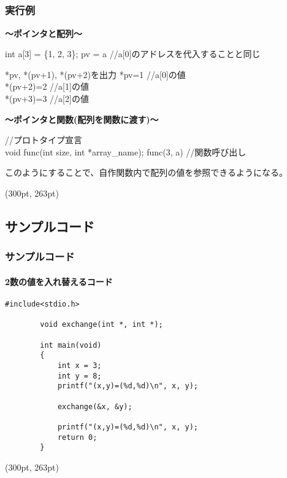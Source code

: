 \documentclass[dvipdfmx]{beamer}
\begin{document}
\subsection{}
\begin{frame}[t, fragile]
    \frametitle{実行例}
    \textbf{～ポインタと配列～}
    \begin{block}{int a[3] = \{1, 2, 3\};}
        pv = a //a[0]のアドレスを代入することと同じ
    \end{block}
    \begin{block}{*pv, *(pv+1), *(pv+2)を出力}
        *pv=1       //a[0]の値\\
        *(pv+2)=2   //a[1]の値\\
        *(pv+3)=3   //a[2]の値
    \end{block}
    \textbf{～ポインタと関数(配列を関数に渡す)～}
    \begin{block}{//プロトタイプ宣言\\
        void func(int size, int *array\_name);}
        func(3, a) //関数呼び出し
    \end{block}
    このようにすることで、自作関数内で配列の値を参照できるようになる。
    \begin{textblock*}{0.3\linewidth}(300pt, 263pt)
        \space
    \end{textblock*}
\end{frame}

\subsection{サンプルコード}
\begin{frame}[t, fragile]
    \frametitle{サンプルコード}
    \framesubtitle{2数の値を入れ替えるコード}
    \begin{lstlisting}[gobble=8, caption=pra\_pointer1.c]
        #include<stdio.h>

        void exchange(int *, int *);

        int main(void)
        {
            int x = 3;
            int y = 8;
            printf("(x,y)=(%d,%d)\n", x, y);

            exchange(&x, &y);
            
            printf("(x,y)=(%d,%d)\n", x, y);
            return 0;
        }
    \end{lstlisting}
    \begin{textblock*}{0.3\linewidth}(300pt, 263pt)
        \space
    \end{textblock*}
\end{frame}
\end{document}
